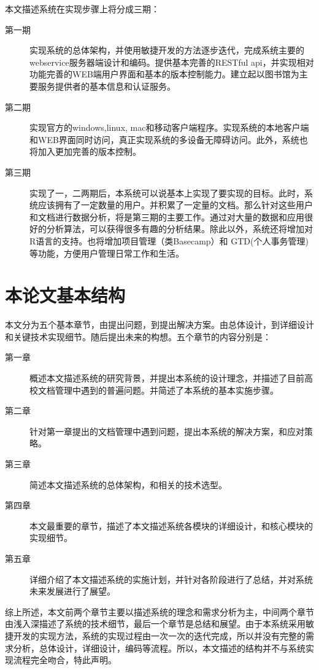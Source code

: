 本文描述系统在实现步骤上将分成三期：
\begin{description}
\item[第一期] 实现系统的总体架构，并使用敏捷开发的方法逐步迭代，完成系统主要的webservice服务器端设计和编码。提供基本完善的RESTful api，并实现相对功能完善的WEB端用户界面和基本的版本控制能力。建立起以图书馆为主要服务提供者的基本信息和认证服务。
\item[第二期] 实现官方的windows,linux, mac和移动客户端程序。实现系统的本地客户端和WEB界面同时访问，真正实现系统的多设备无障碍访问。此外，系统也将加入更加完善的版本控制。
\item[第三期] 实现了一，二两期后，本系统可以说基本上实现了要实现的目标。此时，系统应该拥有了一定数量的用户。并积累了一定量的文档。那么针对这些用户和文档进行数据分析，将是第三期的主要工作。通过对大量的数据和应用很好的分析算法，可以获得很多有趣的分析结果。除此以外，系统还将增加对R语言的支持。也将增加项目管理（类Basecamp）和 GTD(个人事务管理)等功能，方便用户管理日常工作和生活。
\end{description}

\section{本论文基本结构}
\label{sec:paperstruct}


本文分为五个基本章节，由提出问题，到提出解决方案。由总体设计，到详细设计和关键技术实现细节。随后提出未来的构想。五个章节的内容分别是：

\begin{description}
\item[第一章] 概述本文描述系统的研究背景，并提出本系统的设计理念，并描述了目前高校文档管理中遇到的普遍问题。并简述了本系统的基本实施步骤。
\item[第二章] 针对第一章提出的文档管理中遇到问题，提出本系统的解决方案，和应对策略。
\item[第三章] 简述本文描述系统的总体架构，和相关的技术选型。
\item[第四章] 本文最重要的章节，描述了本文描述系统各模块的详细设计，和核心模块的实现细节。
\item[第五章] 详细介绍了本文描述系统的实施计划，并针对各阶段进行了总结，并对系统未来发展进行了展望。
\end{description}

综上所述，本文前两个章节主要以描述系统的理念和需求分析为主，中间两个章节由浅入深描述了系统的技术细节，最后一个章节是总结和展望。由于本系统采用敏捷开发的实现方法，系统的实现过程由一次一次的迭代完成，所以并没有完整的需求分析，总体设计，详细设计，编码等流程。所以，本文描述的结构并不与系统实现流程完全吻合，特此声明。